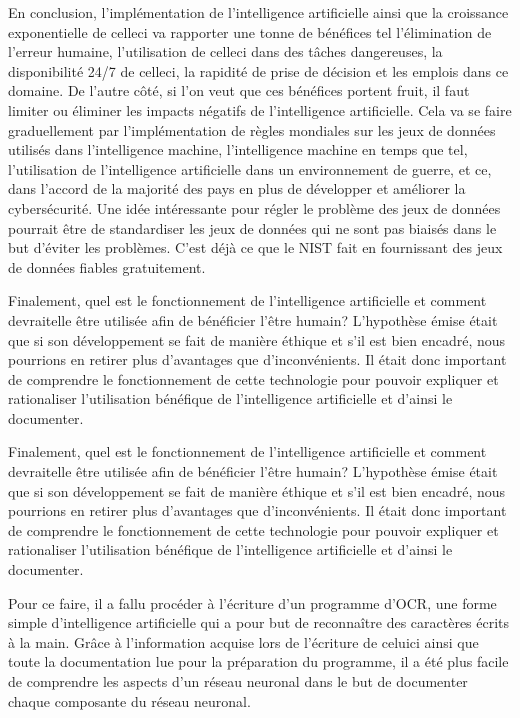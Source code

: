 \documentclass[letterpaper,10pt,french]{sphinxmanual}
\begin{document}
En conclusion, l’implémentation de l’intelligence artificielle ainsi que la croissance
exponentielle de celle\sphinxhyphen{}ci va rapporter une tonne de bénéfices tel l’élimination de l’erreur humaine,
l’utilisation de celle\sphinxhyphen{}ci dans des tâches dangereuses, la disponibilité 24/7 de celle\sphinxhyphen{}ci,
la rapidité de prise de décision et les emplois dans ce domaine. De l’autre côté, si l’on veut
que ces bénéfices portent fruit, il faut limiter ou éliminer les impacts négatifs de l’intelligence
artificielle. Cela va se faire graduellement par l’implémentation de règles mondiales sur les jeux
de données utilisés dans l’intelligence machine, l’intelligence machine en temps que tel, l’utilisation
de l’intelligence artificielle dans un environnement de guerre, et ce, dans l’accord de la majorité
des pays en plus de développer et améliorer la cybersécurité. Une idée intéressante pour régler le
problème des jeux de données pourrait être de standardiser les jeux de données qui ne sont pas biaisés
dans le but d’éviter les problèmes. C’est déjà ce que le NIST fait en fournissant des jeux de données
fiables gratuitement.

Finalement, quel est le fonctionnement de l’intelligence artificielle et comment devrait\sphinxhyphen{}elle être utilisée
afin de bénéficier l’être humain? L’hypothèse émise était que si son développement se fait de manière
éthique et s’il est bien encadré, nous pourrions en retirer plus d’avantages que d’inconvénients. Il
était donc important de comprendre le fonctionnement de cette technologie pour pouvoir expliquer et
rationaliser l’utilisation bénéfique de l’intelligence artificielle et d’ainsi le documenter.

Finalement, quel est le fonctionnement de l’intelligence artificielle et
comment devrait\sphinxhyphen{}elle être utilisée afin de bénéficier l’être humain?
L’hypothèse émise était que si son développement se fait de manière éthique
et s’il est bien encadré, nous pourrions en retirer plus d’avantages que
d’inconvénients. Il était donc important de comprendre le fonctionnement
de cette technologie pour pouvoir expliquer et rationaliser l’utilisation
bénéfique de l’intelligence artificielle et d’ainsi le documenter.

Pour ce faire, il a fallu procéder à l’écriture d’un programme d’OCR, une
forme simple d’intelligence artificielle qui a pour but de reconnaître des
caractères écrits à la main. Grâce à l’information acquise lors de l’écriture
de celui\sphinxhyphen{}ci ainsi que toute la documentation lue pour la préparation du
programme, il a été plus facile de comprendre les aspects d’un réseau neuronal
dans le but de documenter chaque composante du réseau neuronal.
\end{document}

